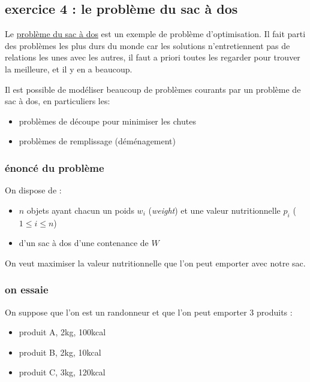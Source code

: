 \documentclass[
]{article}
\providecommand{\tightlist}{%
  \setlength{\itemsep}{0pt}\setlength{\parskip}{0pt}}
\begin{document}
\hypertarget{exercice-4-le-probluxe8me-du-sac-uxe0-dos}{%
\subsection{exercice 4 : le problème du sac à
dos}\label{exercice-4-le-probluxe8me-du-sac-uxe0-dos}}

Le
\href{https://fr.wikipedia.org/wiki/Probl\%C3\%A8me_du_sac_\%C3\%A0_dos}{problème
du sac à dos} est un exemple de problème d'optimisation. Il fait parti
des problèmes les plus durs du monde car les solutions n'entretiennent
pas de relations les unes avec les autres, il faut a priori toutes les
regarder pour trouver la meilleure, et il y en a beaucoup.

Il est possible de modéliser beaucoup de problèmes courants par un
problème de sac à dos, en particuliers les:

\begin{itemize}
\tightlist
\item
  problèmes de découpe pour minimiser les chutes
\item
  problèmes de remplissage (déménagement)
\end{itemize}

\hypertarget{uxe9noncuxe9-du-probluxe8me}{%
\subsubsection{énoncé du problème}\label{uxe9noncuxe9-du-probluxe8me}}

On dispose de :

\begin{itemize}
\tightlist
\item
  \(n\) objets ayant chacun un poids \(w_i\) (\emph{weight}) et une
  valeur nutritionnelle \(p_i\) (\(1 \leq i \leq n\))
\item
  d'un sac à dos d'une contenance de \(W\)
\end{itemize}

On veut maximiser la valeur nutritionnelle que l'on peut emporter avec
notre sac.

\hypertarget{on-essaie}{%
\subsubsection{on essaie}\label{on-essaie}}

On suppose que l'on est un randonneur et que l'on peut emporter 3
produits :

\begin{itemize}
\tightlist
\item
  produit A, 2kg, 100kcal
\item
  produit B, 2kg, 10kcal
\item
  produit C, 3kg, 120kcal
\end{itemize}
\end{document}
